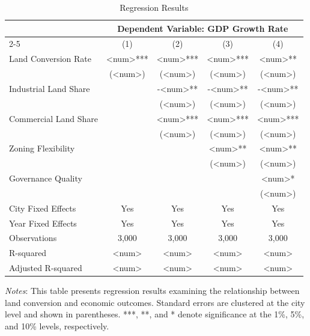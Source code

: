 \begin{table}[ht]
\centering
\caption{Regression Results}
\label{tab:regression}
\begin{tabular}{lcccc}
\toprule
 & \multicolumn{4}{c}{Dependent Variable: GDP Growth Rate} \\
\cmidrule(lr){2-5}
 & (1) & (2) & (3) & (4) \\
\midrule
Land Conversion Rate & <num>*** & <num>*** & <num>*** & <num>** \\
 & (<num>) & (<num>) & (<num>) & (<num>) \\
Industrial Land Share & & -<num>** & -<num>** & -<num>** \\
 & & (<num>) & (<num>) & (<num>) \\
Commercial Land Share & & <num>*** & <num>*** & <num>*** \\
 & & (<num>) & (<num>) & (<num>) \\
Zoning Flexibility & & & <num>** & <num>** \\
 & & & (<num>) & (<num>) \\
Governance Quality & & & & <num>* \\
 & & & & (<num>) \\
\midrule
City Fixed Effects & Yes & Yes & Yes & Yes \\
Year Fixed Effects & Yes & Yes & Yes & Yes \\
Observations & 3,000 & 3,000 & 3,000 & 3,000 \\
R-squared & <num> & <num> & <num> & <num> \\
Adjusted R-squared & <num> & <num> & <num> & <num> \\
\bottomrule
\end{tabular}
\begin{tablenotes}
\small
\item \textit{Notes}: This table presents regression results examining the relationship between land conversion and economic outcomes. Standard errors are clustered at the city level and shown in parentheses. ***, **, and * denote significance at the 1\%, 5\%, and 10\% levels, respectively.
\end{tablenotes}
\end{table}


